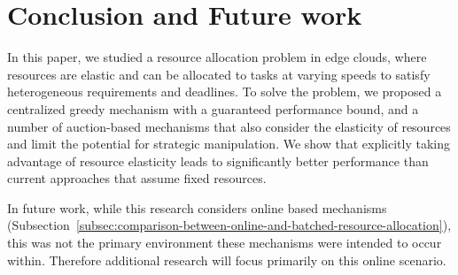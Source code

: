 \section{Conclusion and Future work}\label{sec:conclusion-and-future-work}
In this paper, we studied a resource allocation problem in edge clouds, where resources are elastic and can be
allocated to tasks at varying speeds to satisfy heterogeneous requirements and deadlines. To solve the problem,
we proposed a centralized greedy mechanism with a guaranteed performance bound, and a number of auction-based
mechanisms that also consider the elasticity of resources and limit the potential for strategic manipulation. We show
that explicitly taking advantage of resource elasticity leads to significantly better performance than current
approaches that assume fixed resources.

In future work, while this research considers online based mechanisms
(Subsection~\ref{subsec:comparison-between-online-and-batched-resource-allocation}), this was not the primary
environment these mechanisms were intended to occur within. Therefore additional research will focus primarily on this
online scenario.
